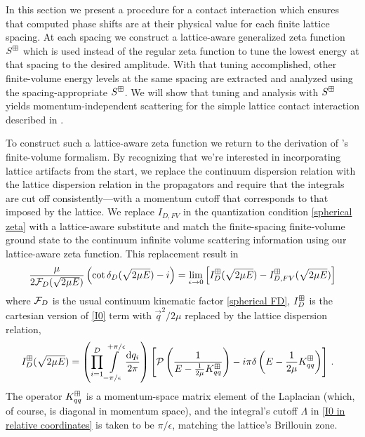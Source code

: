 In this section we present a procedure for a contact interaction which ensures that computed phase shifts are at their physical value for each finite lattice spacing.
At each spacing we construct a lattice-aware generalized \Luscher zeta function $S^{\boxplus}$ which is used instead of the regular zeta function to tune the lowest energy at that spacing to the desired amplitude.
With that tuning accomplished, other finite-volume energy levels at the same spacing are extracted and analyzed using the spacing-appropriate $S^{\boxplus}$.
We will show that tuning and analysis with $S^{\boxplus}$ yields momentum-independent scattering for the simple lattice contact interaction described in .

To construct such a lattice-aware zeta function we return to the derivation of \Luscher's finite-volume formalism.
By recognizing that we're interested in incorporating lattice artifacts from the start, we replace the continuum dispersion relation with the lattice dispersion relation in the propagators and require that the integrals are cut off consistently---with a momentum cutoff that corresponds to that imposed by the lattice.
We replace $I_{D,FV}$ in the quantization condition \eqref{spherical zeta} with a lattice-aware substitute and match the finite-spacing finite-volume ground state to the continuum infinite volume scattering information using our lattice-aware zeta function.
This replacement result in
\begin{equation}
    \label{eq:finite spacing matching}
    \frac{\mu}{2 \mathcal{F}_D(\sqrt{2\mu E})}\left(\cot\delta_D(\sqrt{2\mu E})-i\right)
    =
    \lim_{\epsilon\rightarrow0}
    \left[
    	I_D^{\boxplus}(\sqrt{2\mu E}) - I_{D,FV}^{\boxplus}(\sqrt{2\mu E})
	\right]
\end{equation}
where $\mathcal{F}_D$ is the usual continuum kinematic factor \eqref{spherical FD}, $I_D^{\boxplus}$ is the cartesian version of \eqref{I0} term with $\vec{q}^2/2\mu$ replaced by the lattice dispersion relation,
\begin{align}
	\label{eq:dispersion I0}
    I_D^{\boxplus}(\sqrt{2 \mu E})
    &=
    \left(\prod_{i=1}^D
    \int\limits_{-\pi/\epsilon}^{+\pi/\epsilon}
    \frac{\mathrm{d} q_i}{2\pi}
    \right)
        \left[
            \mathcal{P} \left(
                \frac{1}{
                    E - \frac{1}{2\mu} K_{qq}^\boxplus }
                \right)
            -i \pi \delta\left(E - \frac{1}{2\mu}K_{qq}^\boxplus\right)
        \right]
	\, .
\end{align}
The operator $K_{qq}^\boxplus$ is a momentum-space matrix element of the Laplacian (which, of course, is diagonal in momentum space), and the integral's cutoff $\Lambda$ in \eqref{I0 in relative coordinates} is taken to be $\pi/\epsilon$, matching the lattice's Brillouin zone.
